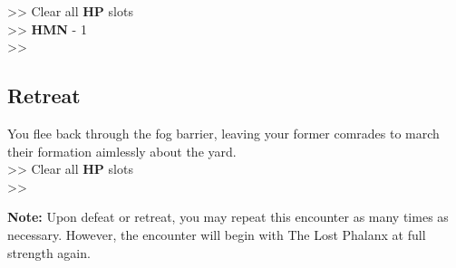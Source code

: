 >> Clear all \textbf{HP} slots\\
>> \textbf{HMN} - 1\\
>> 

\subsection*{Retreat}
You flee back through the fog barrier, leaving your former comrades to march their formation aimlessly about the yard.\\

>> Clear all \textbf{HP} slots\\
>> \\

\begin{tcolorbox}
\textbf{Note:} Upon defeat or retreat, you may repeat this encounter as many times as necessary. However, the encounter will begin with The Lost Phalanx at full strength again.
\end{tcolorbox}